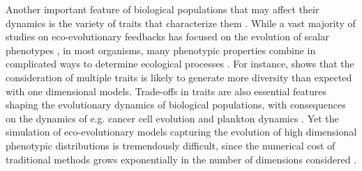 Another important feature of biological populations that may affect their dynamics is the variety of traits that characterize them \citep{Doebeli2011}. While a vast majority of studies on eco-evolutionary feedbacks has focused on the evolution of scalar phenotypes \citep{Doebeli2011}, in most organisms, many phenotypic properties combine in complicated ways to determine ecological processes \citep{Doebeli2014}.
% 
For instance, \cite{Doebeli2011} shows that the consideration of multiple traits is likely to generate more diversity than expected with one dimensional models.
% 
% 
Trade-offs in traits are also essential features shaping the evolutionary dynamics of biological populations, with consequences on the dynamics of e.g. cancer cell evolution \citep{Fiandaca2021} and plankton dynamics \citep{LeGland2020}.
% 
Yet the simulation of eco-evolutionary models capturing the evolution of high dimensional phenotypic distributions is tremendously difficult, since the numerical cost of traditional methods grows exponentially in the number of dimensions considered \citep{Bellman1957}. 
% 

